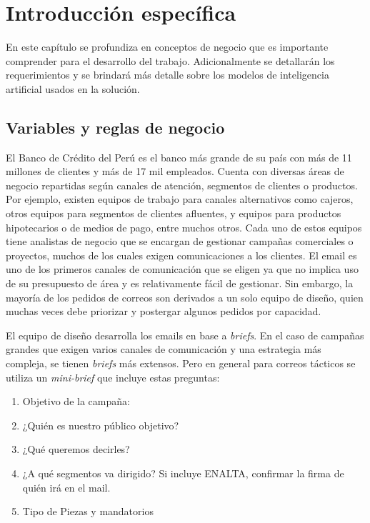 \chapter{Introducción específica} %

\label{Chapter2}

En este capítulo se profundiza en conceptos de negocio que es importante comprender para el desarrollo del trabajo. Adicionalmente se detallarán los requerimientos y se brindará más detalle sobre los modelos de inteligencia artificial usados en la solución.

\section{Variables y reglas de negocio}
\label{sec:Negocio}

El Banco de Crédito del Perú es el banco más grande de su país con más de 11 millones de clientes y más de 17 mil empleados. Cuenta con diversas áreas de negocio repartidas según canales de atención, segmentos de clientes o productos. Por ejemplo, existen equipos de trabajo para canales alternativos como cajeros, otros equipos para segmentos de clientes afluentes, y equipos para productos hipotecarios o de medios de pago, entre muchos otros. Cada uno de estos equipos tiene analistas de negocio que se encargan de gestionar campañas comerciales o proyectos, muchos de los cuales exigen comunicaciones a los clientes. El email es uno de los primeros canales de comunicación que se eligen ya que no implica uso de su presupuesto de área y es relativamente fácil de gestionar. Sin embargo, la mayoría de los pedidos de correos son derivados a un solo equipo de diseño, quien muchas veces debe priorizar y postergar algunos pedidos por capacidad.

El equipo de diseño desarrolla los emails en base a \textit{briefs}. En el caso de campañas grandes que exigen varios canales de comunicación y una estrategia más compleja, se tienen \textit{briefs} más extensos. Pero en general para correos tácticos se utiliza un \textit{mini-brief} que incluye estas preguntas:

\begin{enumerate}
    \item Objetivo de la campaña:
    \item ¿Quién es nuestro público objetivo?
    \item ¿Qué queremos decirles?
    \item ¿A qué segmentos va dirigido? Si incluye ENALTA, confirmar la firma de quién irá en el mail.
    \item Tipo de Piezas y mandatorios
\end{enumerate}

